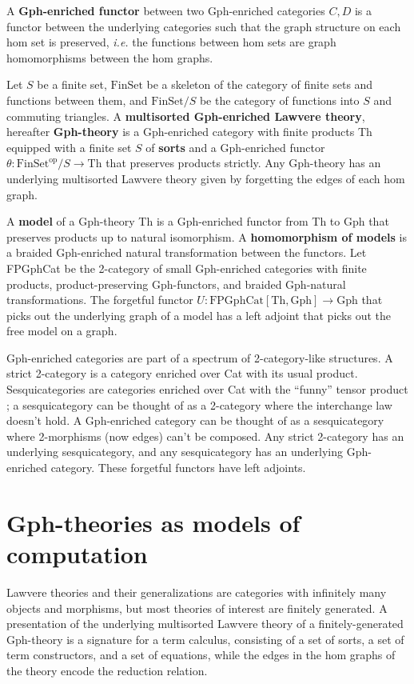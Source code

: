 \documentclass[a4paper,UKenglish]{lipics-v2016}
\newcommand{\maps}{\colon}
\newcommand{\Th}{\mathrm{Th}}
\newcommand{\Gph}{\mathrm{Gph}}
\newcommand{\FinSet}{\mathrm{FinSet}}
\newcommand{\FPGphCat}{\mathrm{FPGphCat}}
\newcommand{\op}{\mathrm{op}}
\begin{document}
A {\bf Gph-enriched functor} between two Gph-enriched categories $C, D$ is a functor between the underlying categories such that the graph structure on each hom set is preserved, {\em i.e.} the functions between hom sets are graph homomorphisms between the hom graphs.

Let $S$ be a finite set, $\FinSet$ be a skeleton of the category of finite sets and functions between them, and $\FinSet/S$ be the category of functions into $S$ and commuting triangles.  A {\bf multisorted Gph-enriched Lawvere theory}, hereafter {\bf Gph-theory} is a Gph-enriched category with finite products Th equipped with a finite set $S$ of {\bf sorts} and a Gph-enriched functor $\theta\maps \FinSet^{\op}/S \to \Th$ that preserves products strictly.  Any Gph-theory has an underlying multisorted Lawvere theory given by forgetting the edges of each hom graph.

A {\bf model} of a Gph-theory Th is a Gph-enriched functor from Th to Gph that preserves products up to natural isomorphism.  A {\bf homomorphism of models} is a braided Gph-enriched natural transformation between the functors.  Let FPGphCat be the 2-category of small Gph-enriched categories with finite products, product-preserving Gph-functors, and braided Gph-natural transformations.  The forgetful functor $U\maps \FPGphCat[\Th, \Gph] \to \Gph$ that picks out the underlying graph of a model has a left adjoint that picks out the free model on a graph.

Gph-enriched categories are part of a spectrum of 2-category-like structures.  A strict 2-category is a category enriched over Cat with its usual product.  Sesquicategories are categories enriched over Cat with the ``funny'' tensor product \cite{Lack2CategoriesCompanion}; a sesquicategory can be thought of as a 2-category where the interchange law doesn't hold.  A Gph-enriched category can be thought of as a sesquicategory where 2-morphisms (now edges) can't be composed.  Any strict 2-category has an underlying sesquicategory, and any sesquicategory has an underlying Gph-enriched category.  These forgetful functors have left adjoints.

\section{Gph-theories as models of computation}

Lawvere theories and their generalizations are categories with infinitely many objects and morphisms, but most theories of interest are finitely generated.  A presentation of the underlying multisorted Lawvere theory of a finitely-generated Gph-theory is a signature for a term calculus, consisting of a set of sorts, a set of term constructors, and a set of equations, while the edges in the hom graphs of the theory encode the reduction relation.
\end{document}
